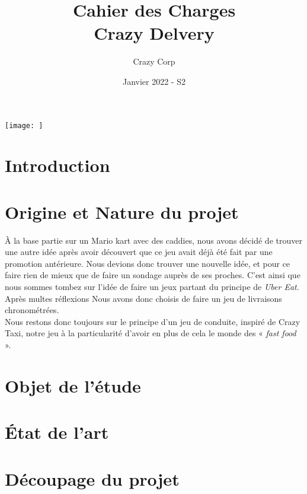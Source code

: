 \documentclass[11pt,a4paper]{article}
\begin{document}
\title{Cahier des Charges \\ {\large Crazy Delvery}}
\author{Crazy Corp}
\date{Janvier 2022 - S2}
\maketitle

\begin{center}
  \texttt{[image: ]}
\end{center}

\tableofcontents
\clearpage

\section{Introduction}
  
\clearpage

\section{Origine et Nature du projet}
À la base partie sur un Mario kart avec des caddies, nous avons décidé de trouver une autre idée après avoir découvert que ce jeu avait déjà été fait par une promotion antérieure. Nous devions donc trouver une nouvelle idée, et pour ce faire rien de mieux que de faire un sondage auprès de ses proches. C'est ainsi que nous sommes tombez sur l'idée de faire un jeux partant du principe de \textit{Uber Eat}. Après multes réflexions Nous avons donc choisis de faire un jeu de livraisons chronométrées.\\
Nous restons donc toujours sur le principe d'un jeu de conduite, inspiré de Crazy Taxi, notre jeu à la particularité d'avoir en plus de cela le monde des « \textit{fast food }».
\clearpage

\section{Objet de l'étude}
  
\clearpage

\section{État de l'art}
  
\clearpage

\section{Découpage du projet}
\end{document}

